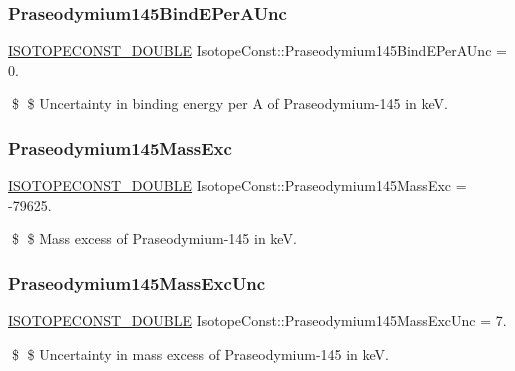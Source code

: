 \subsubsection{\texorpdfstring{Praseodymium145\+Bind\+E\+Per\+A\+Unc}{Praseodymium145BindEPerAUnc}}
{\footnotesize\ttfamily \mbox{\hyperlink{group___isotope_const-_macros_ga8f45a7272ce02c0b4c65c44636ed719a}{I\+S\+O\+T\+O\+P\+E\+C\+O\+N\+S\+T\+\_\+\+D\+O\+U\+B\+LE}} Isotope\+Const\+::\+Praseodymium145\+Bind\+E\+Per\+A\+Unc = 0.}

\$ \$ Uncertainty in binding energy per A of Praseodymium-\/145 in keV. \mbox{\label{group___isotope_const-_praseodymium-_pr145_ga10ca8801e1d6dd273afd608e6f4e02cb}} 
\subsubsection{\texorpdfstring{Praseodymium145\+Mass\+Exc}{Praseodymium145MassExc}}
{\footnotesize\ttfamily \mbox{\hyperlink{group___isotope_const-_macros_ga8f45a7272ce02c0b4c65c44636ed719a}{I\+S\+O\+T\+O\+P\+E\+C\+O\+N\+S\+T\+\_\+\+D\+O\+U\+B\+LE}} Isotope\+Const\+::\+Praseodymium145\+Mass\+Exc = -\/79625.}

\$ \$ Mass excess of Praseodymium-\/145 in keV. \mbox{\label{group___isotope_const-_praseodymium-_pr145_gac4b686508cbcc2658f827d3a493f5bb8}} 
\subsubsection{\texorpdfstring{Praseodymium145\+Mass\+Exc\+Unc}{Praseodymium145MassExcUnc}}
{\footnotesize\ttfamily \mbox{\hyperlink{group___isotope_const-_macros_ga8f45a7272ce02c0b4c65c44636ed719a}{I\+S\+O\+T\+O\+P\+E\+C\+O\+N\+S\+T\+\_\+\+D\+O\+U\+B\+LE}} Isotope\+Const\+::\+Praseodymium145\+Mass\+Exc\+Unc = 7.}

\$ \$ Uncertainty in mass excess of Praseodymium-\/145 in keV. \mbox{\label{group___isotope_const-_praseodymium-_pr145_gab7121b5d91eacb9b23828d2bd9f17d86}} 
